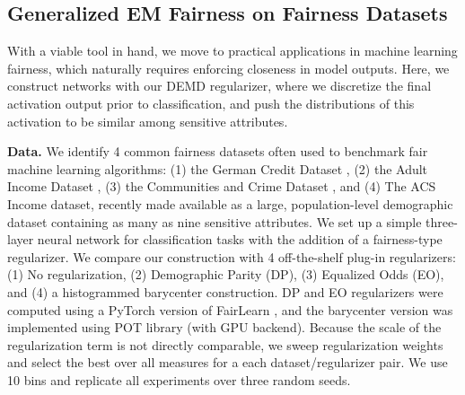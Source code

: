 

\subsection{Generalized EM Fairness on Fairness Datasets}
With a viable tool in hand, we move to practical applications in machine learning fairness,
which naturally requires
enforcing closeness in model outputs.
Here, we construct networks with our DEMD regularizer,
where we discretize the final activation output
prior to classification,
and push the distributions of this activation to be similar
among sensitive attributes.

{\bf Data.}
We identify 4 common fairness datasets often used to benchmark
fair machine learning algorithms: (1) the German Credit Dataset \citep{german}, (2) the Adult Income Dataset \citep{uci}, (3) the Communities and Crime Dataset \citep{crime}, and (4) The ACS Income dataset, recently made available as a large, population-level demographic dataset \citep{ding2021retiring} containing as many as nine sensitive attributes. We set up a simple three-layer neural network for classification tasks with the addition of a fairness-type regularizer. We compare our construction with 4 off-the-shelf plug-in regularizers: (1) No regularization, (2) Demographic Parity (DP), (3) Equalized Odds (EO), and (4) a histogrammed barycenter construction. DP and EO regularizers were computed using a PyTorch version of FairLearn \citep{bird2020fairlearn}, and the barycenter version was implemented using POT library (with GPU backend). Because the scale of the regularization term is not directly comparable, we sweep regularization weights and select the best over all measures for a each dataset/regularizer pair. 
We use 10 bins and replicate all experiments over three random seeds.

